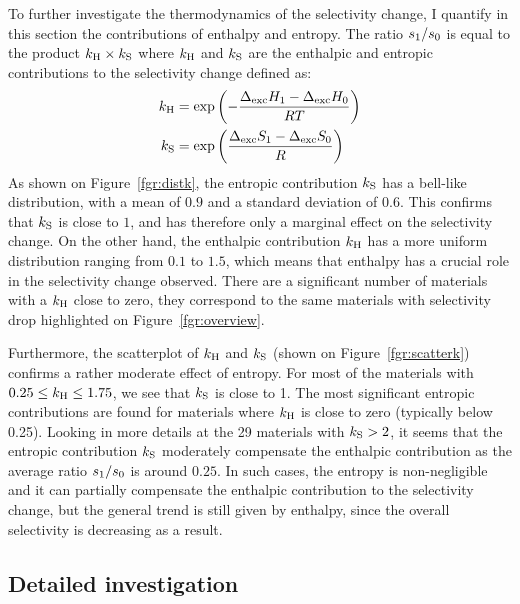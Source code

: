 \documentclass[main.tex]{subfiles}
\begin{document}
To further investigate the thermodynamics of the selectivity change, I quantify in this section the contributions of enthalpy and entropy. The ratio ${s_{\text{1}}}/{s_{\text{0}}}$ is equal to the product $k_{\text{H}} \times k_{\text{S}}$ where $k_{\text{H}}$ and $k_{\text{S}}$ are the enthalpic and entropic contributions to the selectivity change defined as:
\begin{equation}
\label{eq:effects}
    \begin{split}
      k_{\text{H}} & = \exp\left(-\dfrac{\Delta_{\text{exc}}H_{\text{1}}-\Delta_{\text{exc}}H_{\text{0}}}{RT}\right) \\ k_{\text{S}} & = \exp\left(\dfrac{\Delta_{\text{exc}}S_{\text{1}}-\Delta_{\text{exc}}S_{\text{0}}}{R}\right)
    \end{split}
\end{equation}
As shown on Figure~\ref{fgr:distk}, the entropic contribution $k_{\text{S}}$ has a bell-like distribution, with a mean of $0.9$ and a standard deviation of $0.6$. This confirms that $k_{\text{S}}$ is close to $1$, and has therefore only a marginal effect on the selectivity change. On the other hand, the enthalpic contribution $k_{\text{H}}$ has a more uniform distribution ranging from $0.1$ to $1.5$, which means that enthalpy has a crucial role in the selectivity change observed. There are a significant number of materials with a $k_{\text{H}}$ close to zero, they correspond to the same materials with selectivity drop highlighted on Figure~\ref{fgr:overview}.

Furthermore, the scatterplot of $k_{\text{H}}$ and $k_{\text{S}}$ (shown on Figure~\ref{fgr:scatterk}) confirms a rather moderate effect of entropy. For most of the materials with $0.25 \le k_{\text{H}} \le 1.75$, we see that $k_{\text{S}}$ is close to 1. The most significant entropic contributions are found for materials where $k_{\text{H}}$ is close to zero (typically below 0.25). Looking in more details at the 29 materials with $k_{\text{S}}>2$, it seems that the entropic contribution $k_{\text{S}}$ moderately compensate the enthalpic contribution as the average ratio $s_{\text{1}}/s_{\text{0}}$ is around $0.25$. In such cases, the entropy is non-negligible and it can partially compensate the enthalpic contribution to the selectivity change, but the general trend is still given by enthalpy, since the overall selectivity is decreasing as a result.
  
\subsection{Detailed investigation}\label{sec:archetypes}
\end{document}

